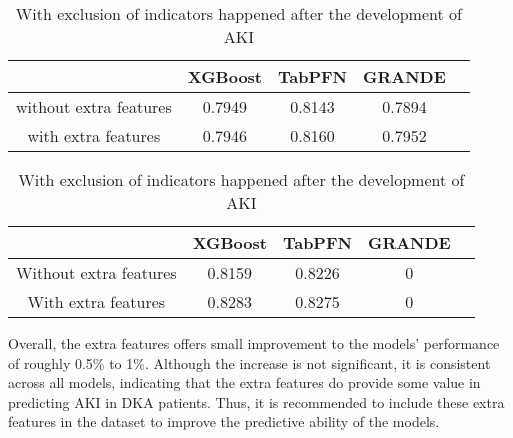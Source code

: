 \documentclass[../main.tex]{subfiles}
\begin{document}
\begin{table}[H]
    \centering
    \caption{AUC-ROC of tabular-based models with and without extra features}
    \label{tab:extra-features}

    \begin{subtable}{\textwidth}
        \centering
        \caption{Without exclusion of indicators happened after the development of AKI}
        \label{tab:extra-features-no-exclusion}
        \begin{tabular}{|c|c|c|c|c|}
            \hline
            \textbf{} & 
            \textbf{XGBoost} & 
            \textbf{TabPFN} & 
            \textbf{GRANDE} \\
            \hline

            without extra features & 
            0.7949 & 
            0.8143 & 
            0.7894 \\

            with extra features & 
            0.7946 & 
            0.8160 & 
            0.7952 \\

            \hline
        \end{tabular}
    \end{subtable}
    
    \vspace{1cm}

    \begin{subtable}{\textwidth}
        \centering
        \caption{With exclusion of indicators happened after the development of AKI}
        \label{tab:extra-features-exclusion}
        \begin{tabular}{|c|c|c|c|c|}
            \hline
            \textbf{} & 
            \textbf{XGBoost} & 
            \textbf{TabPFN} & 
            \textbf{GRANDE} \\
            \hline

            Without extra features & 
            0.8159 & 
            0.8226 & 
            0 \\

            With extra features & 
            0.8283 & 
            0.8275 & 
            0 \\

            \hline
        \end{tabular}
    \end{subtable}

\end{table}

Overall, the extra features offers small improvement to the models' performance of roughly 0.5\% to 1\%.
Although the increase is not significant, it is consistent across all models, indicating that the extra features do provide some value in predicting AKI in DKA patients.
Thus, it is recommended to include these extra features in the dataset to improve the predictive ability of the models.
\end{document}
